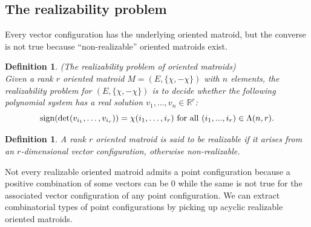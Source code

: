 \documentclass{article}
\newtheorem{defn2}[thm]{\bfseries Definition}
\begin{document}
\subsection{The realizability problem}
Every vector configuration has the underlying oriented matroid, 
but the converse is not true because ``non-realizable'' oriented matroids exist.
\begin{defn2}(The realizability problem of oriented matroids)\label{realizability_def}\\
Given a rank $r$ oriented matroid $M=(E,\{ \chi ,-\chi \} )$ with $n$ elements,
the {\it realizability problem for\/} $(E,\{ \chi ,-\chi \} )$ is  to decide
whether the following polynomial system has a real solution $v_{1},\dots,v_{n} \in \mathbb{R}^{r}$:
\begin{equation}
\label{realizability}
 {\rm sign}(\det(v_{i_1},\dots,v_{i_r})) = \chi (i_1,\dots,i_r) 
 \text{ for all }  (i_1,...,i_r) \in \Lambda (n,r).
 \end{equation}
\end{defn2}

\begin{defn2}
\label{def:realizable}
A rank $r$ oriented matroid is said to be {\it realizable} if it arises from an $r$-dimensional vector configuration,
otherwise {\it non-realizable}.
\end{defn2}
Not every realizable oriented matroid admits a point configuration
because a positive combination of some vectors can be $0$
while the same is not true for the associated vector configuration of any point configuration.
We can extract combinatorial types of point configurations by picking up acyclic realizable oriented matroids.
\end{document}
